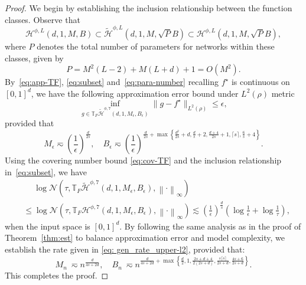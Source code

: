 \documentclass[11pt]{article}
\begin{document}
\begin{proof}
    We begin by establishing the inclusion relationship between the function classes. Observe that
    \begin{equation}
        \mathcal{H}^{\phi,L}(d, 1, M, B) \subset \widetilde{\mathcal{H}}^{\phi,L}(d, 1, M, \sqrt{P} B) \subset \mathcal{H}^{\phi,L}(d, 1, M, \sqrt{P} B),
        \label{eq:subset}
    \end{equation}
    where $P$ denotes the total number of parameters for networks within these classes, given by
    \begin{equation}
        P= M^2(L-2) + M(L+d) + 1 = O(M^2).
        \label{eq:para-number}
    \end{equation}
    By~\eqref{eq:app-TF}, \eqref{eq:subset} and~\eqref{eq:para-number}  recalling $f^{\star}$ is continuous on $[0,1]^d$, we have the following approximation error bound under $L^2(\rho)$ metric
    \begin{equation}
        \inf_{g \in \mathbb{T}_{F} \widetilde{\mathcal{H}}^{\phi,7}(d, 1, M_{\epsilon}, B_\epsilon) } \|g - f^{\star}\|_{L^2(\rho)} \leq  \epsilon,
    \end{equation}
    provided that 
    \begin{equation*}
        M_{\epsilon} \eqsim \left( \frac{1}{\epsilon}\right)^{\frac{d}{2s}}, \quad B_{\epsilon} \eqsim \left( \frac{1}{\epsilon}\right)^{\frac{d}{2s}+ \max \left\{ \frac{d^2}{2s}+d, \frac{d}{s}+2, \frac{d+4}{2s}+1, \lceil s \rceil, \frac{6}{s}+4\right\}}. 
    \end{equation*}
    Using the covering number bound \eqref{eq:cov-TF}  and the inclusion relationship in~\eqref{eq:subset}, we have
    \begin{equation*}
        \begin{aligned}
             &\quad \; \log \mathcal{N} \left(\tau, \mathbb{T}_{F} \widetilde{\mathcal{H}}^{\phi,7}(d, 1, M_{\epsilon}, B_{\epsilon}), \left\|\cdot\right\|_\infty \right) \\
             &\leq \log \mathcal{N} \left(\tau, \mathbb{T}_{F}{\mathcal{H}}^{\phi,7}(d, 1, M_{\epsilon}, B_{\epsilon}), \left\|\cdot\right\|_\infty \right) \lesssim \left( \frac{1}{\epsilon}\right)^{\frac{d}{s}} \left(\log \frac{1}{\epsilon} + \log \frac{1}{\tau}\right),
        \end{aligned}
    \end{equation*}
    when the input space is $[0,1]^d$.
    By following the same analysis as in the proof of Theorem~\ref{thm:est} to balance approximation error and model complexity, we establish the rate given in \eqref{eq: gen_rate_upper-l2}, provided that:
    \begin{equation*}
        M_n ~\eqsim n^{\frac{d}{4s+2d}}, \quad B_n ~\eqsim n^{\frac{d}{4s+2d}+\max \left\{ \frac{d}{2}, 1, \frac{2s+d+4}{2(2s+d)}, \frac{s \lceil s\rceil}{2s+d},\frac{4s+6}{2s+d} \right\}} .
    \end{equation*}
    This completes the proof. 
\end{proof}
\end{document}
